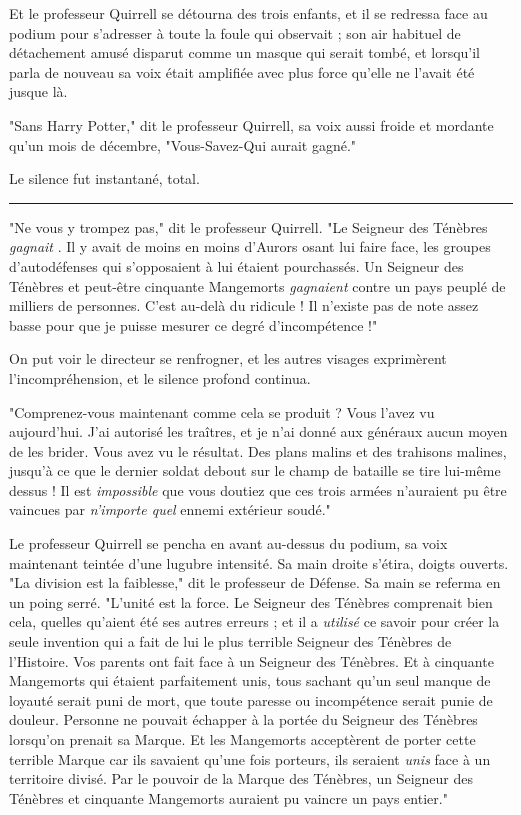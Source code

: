 Et le professeur Quirrell se détourna des trois enfants, et il se redressa face au podium pour s'adresser à toute la foule qui observait ; son air habituel de détachement amusé disparut comme un masque qui serait tombé, et lorsqu'il parla de nouveau sa voix était amplifiée avec plus force qu'elle ne l'avait été jusque là.

"Sans Harry Potter," dit le professeur Quirrell, sa voix aussi froide et mordante qu'un mois de décembre, "Vous-Savez-Qui aurait gagné."

Le silence fut instantané, total.
\par\noindent\rule{\textwidth}{0.4pt}
"Ne vous y trompez pas," dit le professeur Quirrell. "Le Seigneur des Ténèbres \emph{gagnait} . Il y avait de moins en moins d'Aurors osant lui faire face, les groupes d'autodéfenses qui s'opposaient à lui étaient pourchassés. Un Seigneur des Ténèbres et peut-être cinquante Mangemorts \emph{gagnaient}  contre un pays peuplé de milliers de personnes. C'est au-delà du ridicule ! Il n'existe pas de note assez basse pour que je puisse mesurer ce degré d'incompétence !"

On put voir le directeur se renfrogner, et les autres visages exprimèrent l'incompréhension, et le silence profond continua.

"Comprenez-vous maintenant comme cela se produit ? Vous l'avez vu aujourd'hui. J'ai autorisé les traîtres, et je n'ai donné aux généraux aucun moyen de les brider. Vous avez vu le résultat. Des plans malins et des trahisons malines, jusqu'à ce que le dernier soldat debout sur le champ de bataille se tire lui-même dessus ! Il est \emph{impossible}  que vous doutiez que ces trois armées n'auraient pu être vaincues par \emph{n'importe quel}  ennemi extérieur soudé."

Le professeur Quirrell se pencha en avant au-dessus du podium, sa voix maintenant teintée d'une lugubre intensité. Sa main droite s'étira, doigts ouverts. "La division est la faiblesse," dit le professeur de Défense. Sa main se referma en un poing serré. "L'unité est la force. Le Seigneur des Ténèbres comprenait bien cela, quelles qu'aient été ses autres erreurs ; et il a \emph{utilisé}  ce savoir pour créer la seule invention qui a fait de lui le plus terrible Seigneur des Ténèbres de l'Histoire. Vos parents ont fait face à un Seigneur des Ténèbres. Et à cinquante Mangemorts qui étaient parfaitement unis, tous sachant qu'un seul manque de loyauté serait puni de mort, que toute paresse ou incompétence serait punie de douleur. Personne ne pouvait échapper à la portée du Seigneur des Ténèbres lorsqu'on prenait sa Marque. Et les Mangemorts acceptèrent de porter cette terrible Marque car ils savaient qu'une fois porteurs, ils seraient \emph{unis}  face à un territoire divisé. Par le pouvoir de la Marque des Ténèbres, un Seigneur des Ténèbres et cinquante Mangemorts auraient pu vaincre un pays entier."

